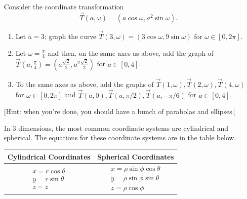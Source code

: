 \begin{problem}
Consider the coordinate transformation $$\vec T(a,\omega)=(a\cos\omega,a^2\sin \omega).$$
\begin{enumerate}
\item{}%
 Let $a=3$; graph the curve $\vec T(3,\omega)=(3\cos\omega,9\sin\omega)$ for $\omega\in[0,2\pi]$.
\item{}%
 Let $\omega =\frac{\pi}{4}$ and then, on the same axes as above, add the graph of 
$\vec T\left(a,\frac{\pi}{4}\right)=\left(a\frac{\sqrt 2}{2},a^2 \frac{\sqrt 2}{2}\right)$ for $a\in[0,4]$.
\item{}To the same axes as above, add the graphs of 
$\vec T(1,\omega), \vec T(2,\omega), \vec T(4,\omega)$  for $\omega\in[0,2\pi]$ and 
$\vec T(a,0), \vec T(a,\pi/2), \vec T(a,-\pi/6)$ for $a\in[0,4]$. 
\end{enumerate}
[Hint: when you're done, you should have a bunch of parabolas and ellipses.]
\end{problem}

In 3 dimensions, the most common coordinate systems are cylindrical and spherical.  The equations for these coordinate systems are in the table below. 
\begin{center}
\begin{tabular}{cc}
Cylindrical Coordinates & Spherical Coordinates\\
\hline
$\begin{array}{l}
x=r\cos\theta\\
y=r\sin\theta\\
z=z
\end{array}$
&
$\begin{array}{l}
x=\rho\sin\phi\cos\theta\\
y=\rho\sin\phi\sin\theta\\
z=\rho\cos\phi
\end{array}$
\end{tabular}
\end{center}

